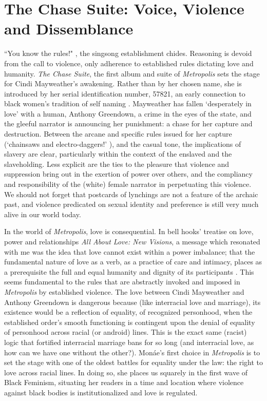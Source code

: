 \documentclass[a4paper, 11pt]{article} %
\begin{document}

\section*{The Chase Suite: Voice, Violence and Dissemblance}

``You know the rules!" \cite{wolfmasters}, the singsong establishment chides.
Reasoning is devoid from the call to violence, only adherence to established rules dictating love and humanity.
\emph{The Chase Suite}, the first album and suite of \emph{Metropolis} sets the stage for Cindi Mayweather's awakening.
Rather than by her chosen name, she is introduced by her serial identification number, 57821, an early connection to black women's tradition of self naming \cite{selfnaming}.
Mayweather has fallen `desperately in love' with a human, Anthony Greendown, a crime in the eyes of the state, and the gleeful narrator is announcing her punishment: a chase for her capture and destruction.
Between the arcane and specific rules issued for her capture (`chainsaws and electro-daggers!' \cite{wolfmasters}), and the casual tone, the implications of slavery are clear, particularly within the context of the enslaved and the slaveholding. 
Less explicit are the ties to the pleasure that violence and suppression bring out in the exertion of power over others, and the compliancy and responsibility of the (white) female narrator in perpetuating this violence.
We should not forget that postcards of lynchings are not a feature of the archaic past, and violence predicated on sexual identity and preference is still very much alive in our world today.

In the world of \emph{Metropolis}, love is consequential.
In bell hooks' treatise on love, power and relationships \emph{All About Love: New Visions}, a message which resonated with me was the idea that love cannot exist within a power imbalance; that the fundamental nature of love as a verb, as a practice of care and intimacy, places as a prerequisite the full and equal humanity and dignity of its participants \cite{newvisions}. 
This seems fundamental to the rules that are abstractly invoked and imposed in \emph{Metropolis} by established violence. 
The love between Cindi Mayweather  and Anthony Greendown is dangerous because (like interracial love and marriage), its existence would be a reflection of equality, of recognized personhood, when the established order's smooth functioning is contingent upon the denial of equality of personhood across racial (or android) lines. 
This is the exact same (racist) logic that fortified interracial marriage bans for so long (and interracial love, as how can we have one without the other?).
Mon\'ae's first choice in \emph{Metropolis} is to set the stage with one of the oldest battles for equality under the law: the right to love across racial lines.
In doing so, she places us squarely in the first wave of Black Feminism, situating her readers in a time and location where violence against black bodies is institutionalized and love is regulated.
\end{document}

